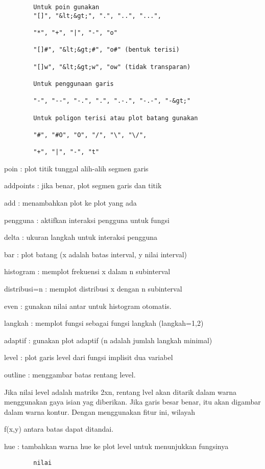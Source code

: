 \documentclass[
]{book}
\begin{document}
\begin{verbatim}
        Untuk poin gunakan
        "[]", "&lt;&gt;", ".", "..", "...",

        "*", "+", "|", "-", "o"

        "[]#", "&lt;&gt;#", "o#" (bentuk terisi)

        "[]w", "&lt;&gt;w", "ow" (tidak transparan)

        Untuk penggunaan garis

        "-", "--", "-.", ".", ".-.", "-.-", "-&gt;"

        Untuk poligon terisi atau plot batang gunakan

        "#", "#O", "O", "/", "\", "\/",

        "+", "|", "-", "t"
\end{verbatim}

poin : plot titik tunggal alih-alih segmen garis

addpoints : jika benar, plot segmen garis dan titik

add : menambahkan plot ke plot yang ada

pengguna : aktifkan interaksi pengguna untuk fungsi

delta : ukuran langkah untuk interaksi pengguna

bar : plot batang (x adalah batas interval, y nilai interval)

histogram : memplot frekuensi x dalam n subinterval

distribusi=n : memplot distribusi x dengan n subinterval

even : gunakan nilai antar untuk histogram otomatis.

langkah : memplot fungsi sebagai fungsi langkah (langkah=1,2)

adaptif : gunakan plot adaptif (n adalah jumlah langkah minimal)

level : plot garis level dari fungsi implisit dua variabel

outline : menggambar batas rentang level.

Jika nilai level adalah matriks 2xn, rentang lvel akan ditarik dalam warna menggunakan gaya isian yag diberikan. Jika garis besar benar, itu akan digambar dalam warna kontur. Dengan menggunakan fitur ini, wilayah

f(x,y) antara batas dapat ditandai.

hue : tambahkan warna hue ke plot level untuk menunjukkan fungsinya

\begin{verbatim}
        nilai
\end{verbatim}
\end{document}
